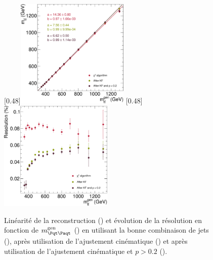 \begin{figure}[tbp] \centering
    \subcaptionbox{\label{fig:mtt_response_kf_good}}[0.48\textwidth]{\includegraphics[width=0.48\textwidth]{chapitre6/figs/kinfit/mtt_response_vs_gen_comparison_kf_good_solutions.pdf}} \hfill
    \subcaptionbox{\label{fig:mtt_reso_vs_mtt_gen_kf_good}}[0.48\textwidth]{\includegraphics[width=0.48\textwidth]{chapitre6/figs/kinfit/mtt_resolution_vs_gen_comparison_kf_good_solutions.pdf}}
    \caption{Linéarité de la reconstruction () et évolution de la résolution en fonction de $\mtt^\text{gen}$ () en utilisant la bonne combinaison de jets (\rouge), après utilisation de l'ajustement cinématique (\vertc) et après utilisation de l'ajustement cinématique et $p > \num{0.2}$ (\violet).}
    \label{fig:mtt_resp_reso_kf_good}
\end{figure}


